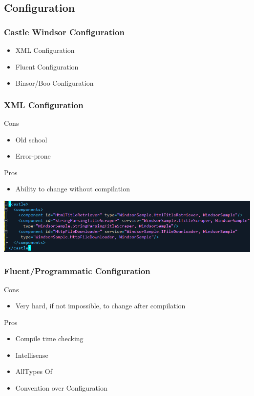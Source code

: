 \documentclass[turkish]{beamer}
\begin{document}
	\subsection{Configuration}
		\frame
		{
			\frametitle{Castle Windsor Configuration}
			\begin{itemize}
				\item<1->XML Configuration
				\item<2->Fluent Configuration
				\item<3->Binsor/Boo Configuration
			\end{itemize}
		}
		\frame
		{
			\frametitle{XML Configuration}
			\begin{block}{Cons}
				\begin{itemize}
					\item<1->Old school
					\item<2->Error-prone
				\end{itemize}
			\end{block}
			\begin{block}{Pros}
				\begin{itemize}
				  \item<3->Ability to change without compilation
				\end{itemize}
			\end{block}
	
			\begin{center}
				\includegraphics[scale=0.40]{images/xmlconfiguration.png}
			\end{center}
		}
	  \frame
		{
			\frametitle{Fluent/Programmatic Configuration}
			\begin{block}{Cons}
				\begin{itemize}
					\item<1->Very hard, if not impossible, to change after compilation
				\end{itemize}
			\end{block}
			\begin{block}{Pros}
				\begin{itemize}
					\item<2->Compile time checking
					\item<3->Intellisense
					\item<4->AllTypes Of
					\item<5->Convention over Configuration
				\end{itemize}
			\end{block}
		}
\end{document}
